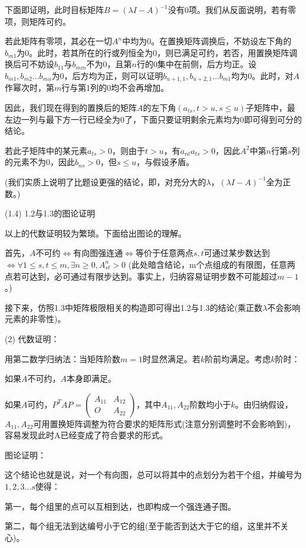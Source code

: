 \documentclass[a4paper,UTF8,fontset=windows]{ctexart}
\begin{document}
\begin{enumerate}
下面即证明，此时目标矩阵$B=(\lambda I-A)^{-1}$没有0项。我们从反面说明，若有零项，则矩阵可约。

若此矩阵有零项，其必在一切$A^n$中均为0。在置换矩阵调换后，不妨设左下角的$b_{m1}$为0。此时，若其所在的行或列恒全为0，则已满足可约，若否，用置换矩阵调换后可不妨设$b_{11}$与$b_{mm}$不为0，且第$n$行的0集中在前侧，后方均正。设$b_{m1},b_{m2}\dots b_{mu}$为0，后方均为正，则可以证明$b_{u+1,1},b_{u+2,1}\dots b_{m1}$均为0。此时，对$A$作幂次时，第$m$行与第1列的0均不会再增加。

因此，我们现在得到的置换后的矩阵$A$的左下角$(a_{ts},t>u,s\le u)$子矩阵中，最左边一列与最下方一行已经全为0了，下面只要证明剩余元素均为0即可得到可分的结论。

若此子矩阵中的某元素$a_{ts}>0$，则由于$t>u$，有$a_{nt}a_{ts}>0$，因此$A^2$中第$n$行第$s$列的元素不为0，因此$b_{ns}>0$，但$s\le u$，与假设矛盾。

(我们实质上说明了比题设更强的结论，即，对充分大的$\lambda$，$(\lambda I-A)^{-1}$全为正数。)

(1.4) 1.2与1.3的图论证明

以上的代数证明较为繁琐。下面给出图论的理解。

首先，$A$不可约$\Leftrightarrow$有向图强连通$\Leftrightarrow$等价于任意两点$s,t$可通过某步数达到$\Leftrightarrow\forall1\le s,t\le m,\exists n\ge0,A_{st}^n>0$ (此处暗含结论，m个点组成的有限图，任意两点若可达到，必可通过有限步达到。事实上，归纳容易证明步数不可能超过$m-1$。)

接下来，仿照1.3中矩阵极限相关的构造即可得出1.2与1.3的结论(乘正数$\lambda$不会影响元素的非零性)。

(2) 代数证明：

用第二数学归纳法：当矩阵阶数$m=1$时显然满足。若$k$阶前均满足。考虑$k$阶时：

如果$A$不可约，$A$本身即满足。

如果$A$可约，$P^TAP=\begin{pmatrix}A_{11}&A_{12}\\O&A_{22}\end{pmatrix}$，其中$A_{11},A_{22}$阶数均小于$k$。由归纳假设，$A_{11},A_{22}$可用置换矩阵调整为符合要求的矩阵形式(注意分别调整时不会影响到)，容易发现此时A已经变成了符合要求的形式。

图论证明：

这个结论也就是说，对一个有向图，总可以将其中的点划分为若干个组，并编号为$1,2,3\dots s$使得：

第一，每个组里的点可以互相到达，也即构成一个强连通子图。

第二，每个组无法到达编号小于它的组(至于能否到达大于它的组，这里并不关心)。


\end{enumerate}
\end{document}
